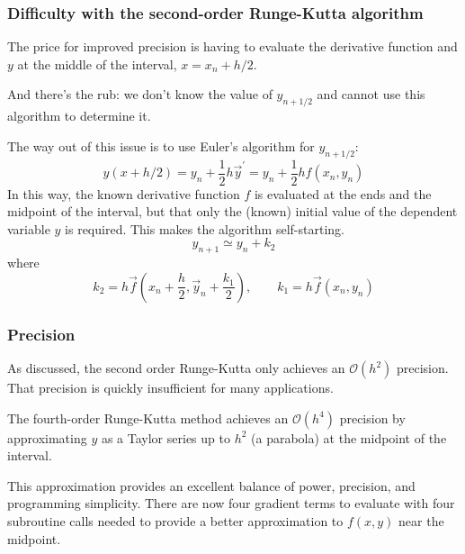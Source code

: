 \documentclass[hyperref={colorlinks=true}]{beamer}
\begin{document}

\begin{frame}%
  \frametitle{Difficulty with the second-order Runge-Kutta algorithm} 

  The price for improved precision is having to evaluate the derivative function and $y$ at the middle of the interval, $x = x_n + h/2$.
  
  \mysp
  
  And there's the rub: we don't know the value of $y_{n+1/2}$ and cannot use this algorithm to determine it.
  
  \mysp
  
  The way out of this issue is to use Euler's algorithm for $y_{n+1/2}$:
  \begin{equation}
    y(x + h/2) = y_n + \frac{1}{2}h\vec{y}^{\prime} = y_n + \frac{1}{2}hf(x_n,y_n)
  \end{equation}
  In this way, the known derivative function $f$ is evaluated at the ends and the midpoint of the interval, but that only the (known) initial value of the dependent variable $y$ is required. This makes the algorithm self-starting.
  \begin{equation}
    y_{n+1} \simeq y_n + k_2 
  \end{equation}
  where
  \begin{equation}
    k_2=h\vec{f}(x_n + \frac{h}{2}, \vec{y}_{n} + \frac{k_1}{2}), \qquad k_1 = h\vec{f}(x_n, y_n)  
  \end{equation}

\end{frame}


\begin{frame}%
  \frametitle{Precision}

  As discussed, the second order Runge-Kutta only achieves an $\mathcal{O}(h^2)$ precision. That precision is quickly insufficient for many applications.
  
  \mysp
  
  The fourth-order Runge-Kutta method achieves an $\mathcal{O}(h^4)$ precision by approximating $y$ as a Taylor series up to $h^2$ (a parabola) at the midpoint of the interval.
  
  \mysp
  
  This approximation provides an excellent balance of power, precision, and programming simplicity. There are now four gradient terms to evaluate with four subroutine calls needed to provide a better approximation to $f(x,y)$ near the midpoint.
  
\end{frame}
\end{document}
